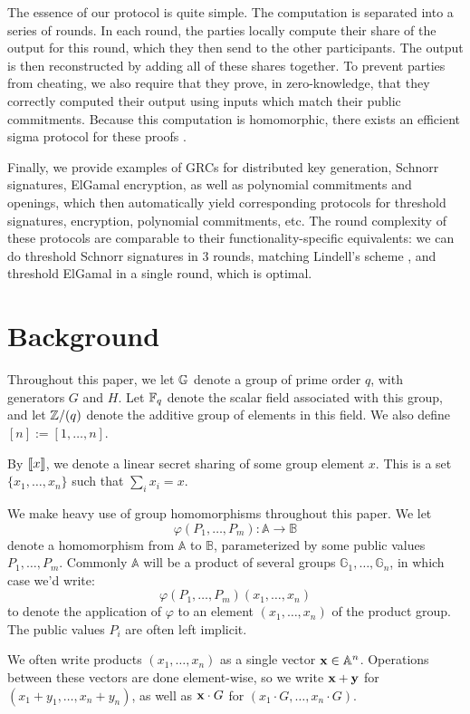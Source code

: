 The essence of our protocol is quite simple.
The computation
is separated into a series of rounds.
In each round, the parties locally compute their share
of the output for this round, which they then send
to the other participants.
The output is then reconstructed by adding all of these
shares together.
To prevent parties from cheating, we also require
that they prove, in zero-knowledge, that they correctly computed their output using inputs
which match their public commitments.
Because this computation is homomorphic,
there exists an efficient sigma protocol for
these proofs \cite{maurer_unifying_2009}.

Finally, we provide examples of GRCs for distributed key generation,
Schnorr signatures, ElGamal encryption, as well as polynomial commitments
and openings, which then automatically yield corresponding
protocols for threshold signatures, encryption, polynomial commitments,
etc.
The round complexity of these protocols are comparable
to their functionality-specific equivalents: we can do threshold
Schnorr signatures in 3 rounds, matching Lindell's scheme \cite{lindell_simple_2022},
and threshold ElGamal in a single round, which is optimal.

\section{Background}
\label{sec:background}

Throughout this paper, we let $\mathbb{G}$ denote a group of prime order $q$,
with generators $G$ and $H$. Let $\mathbb{F}_q$ denote the scalar field associated
with this group, and let $\mathbb{Z}/(q)$ denote the additive group of elements
in this field. We also define $[n] := [1, \ldots, n]$.

By $\llbracket x\rrbracket$, we denote a linear secret sharing of some group element
$x$. This is a set $\{x_1, \ldots, x_n\}$ such that $\sum_i x_i = x$.

We make heavy use of group homomorphisms throughout this paper.
We let
$$
\varphi(P_1, \ldots, P_m) : \mathbb{A} \to \mathbb{B}
$$
denote a homomorphism from $\mathbb{A}$ to $\mathbb{B}$, parameterized
by some public values $P_1, \ldots, P_m$. Commonly $\mathbb{A}$
will be a product of several groups $\mathbb{G}_1, \ldots, \mathbb{G}_n$,
in which case we'd write:
$$
\varphi(P_1, \ldots, P_m)(x_1, \ldots, x_n)
$$
to denote the application of $\varphi$ to an element $(x_1, \ldots, x_n)$
of the product group. The public values $P_i$ are often left implicit.

We often write products $(x_1, \ldots, x_n)$ as a single vector
$\textbf{x} \in \mathbb{A}^n$. Operations between these vectors
are done element-wise, so we write $\textbf{x} + \textbf{y}$ for ${(x_1 + y_1, \ldots, x_n + y_n)}$,
as well as $\textbf{x} \cdot G$ for $(x_1 \cdot G, \ldots, x_n \cdot G)$.


